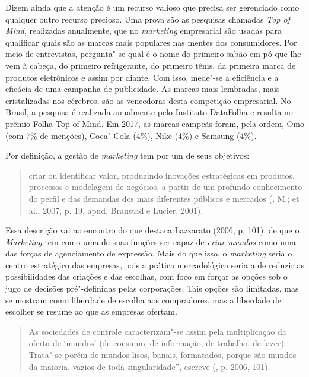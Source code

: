 Dizem ainda que a atenção é um recurso valioso que precisa ser
gerenciado como qualquer outro recurso precioso. Uma prova são as
pesquisas chamadas \emph{Top of Mind}, realizadas anualmente, que no
\emph{marketing} empresarial são usadas para qualificar quais são as
marcas mais populares nas mentes dos consumidores. Por meio de
entrevistas, pergunta"-se qual é o nome do primeiro sabão em pó que lhe
vem à cabeça, do primeiro refrigerante, do primeiro tênis, da primeira
marca de produtos eletrônicos e assim por diante. Com isso, mede"-se a
eficiência e a eficácia de uma campanha de publicidade. As marcas mais
lembradas, mais cristalizadas nos cérebros, são as vencedoras desta
competição empresarial. No Brasil, a pesquisa é realizada anualmente
pelo Instituto DataFolha e resulta no prêmio Folha Top of Mind. Em 2017,
as marcas campeãs foram, pela ordem, Omo (com 7\% de menções), Coca"-Cola
(4\%), Nike (4\%) e Samsung (4\%).

Por definição, a gestão de \emph{marketing} tem por um de seus
objetivos:

\begin{quote}
criar ou identificar valor, produzindo inovações estratégicas em
produtos, processos e modelagem de negócios, a partir de um profundo
conhecimento do perfil e das demandas dos mais diferentes públicos e
mercados (, M.; et al., 2007, p. 19, apud. Branstad e Lucier, 2001).
\end{quote}

Essa descrição vai ao encontro do que destaca Lazzarato (2006, p. 101),
de que o \emph{Marketing} tem como uma de suas funções ser capaz de
\emph{criar mundos} como uma das forças de agenciamento de expressão.
Mais do que isso, o \emph{marketing} seria o centro estratégico das
empresas, pois a prática mercadológica seria a de reduzir as
possibilidades das criações e das escolhas, com foco em forçar as opções
sob o jugo de decisões pré"-definidas pelas corporações. Tais opções são
limitadas, mas se mostram como liberdade de escolha aos compradores, mas
a liberdade de escolher se resume ao que as empresas ofertam.

\begin{quote}
As sociedades de controle caracterizam"-se assim pela multiplicação da
oferta de `mundos' (de consumo, de informação, de trabalho, de lazer).
Trata"-se porém de mundos lisos, banais, formatados, porque são mundos da
maioria, vazios de toda singularidade'', escreve (, p. 2006,
101).
\end{quote}


